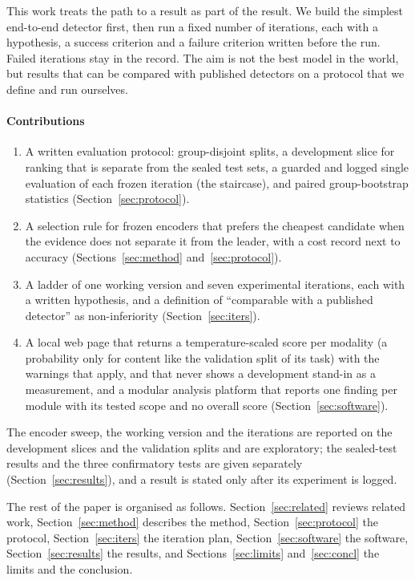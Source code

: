 \documentclass[conference,a4paper]{IEEEtran_nodash}
\begin{document}
This work treats the path to a result as part of the result. We build the
simplest end-to-end detector first, then run a fixed number of iterations,
each with a hypothesis, a success criterion and a failure criterion written
before the run. Failed iterations stay in the record. The aim is not the
best model in the world, but results that can be compared with published
detectors on a protocol that we define and run ourselves.

\paragraph*{Contributions}
\begin{enumerate}
  \item A written evaluation protocol: group-disjoint splits, a development
        slice for ranking that is separate from the sealed test sets, a
        guarded and logged single evaluation of each frozen iteration (the
        staircase), and paired group-bootstrap statistics
        (Section~\ref{sec:protocol}).
  \item A selection rule for frozen encoders that prefers the cheapest
        candidate when the evidence does not separate it from the leader, with
        a cost record next to accuracy (Sections~\ref{sec:method}
        and~\ref{sec:protocol}).
  \item A ladder of one working version and seven experimental iterations,
        each with a written hypothesis, and a definition of ``comparable with
        a published detector'' as non-inferiority
        (Section~\ref{sec:iters}).
  \item A local web page that returns a temperature-scaled score per modality
        (a probability only for content like the validation split of its task)
        with the warnings that apply, and that never shows a development
        stand-in as a measurement, and a modular analysis platform that reports
        one finding per module with its tested scope and no overall score
        (Section~\ref{sec:software}).
\end{enumerate}
The encoder sweep, the working version and the iterations are reported on the
development slices and the validation splits and are exploratory; the
sealed-test results and the three confirmatory tests are given separately
(Section~\ref{sec:results}), and a result is stated only after its experiment
is logged.

The rest of the paper is organised as follows. Section~\ref{sec:related}
reviews related work, Section~\ref{sec:method} describes the method,
Section~\ref{sec:protocol} the protocol, Section~\ref{sec:iters} the iteration
plan, Section~\ref{sec:software} the software, Section~\ref{sec:results} the
results, and Sections~\ref{sec:limits} and~\ref{sec:concl} the limits and the
conclusion.
\end{document}
